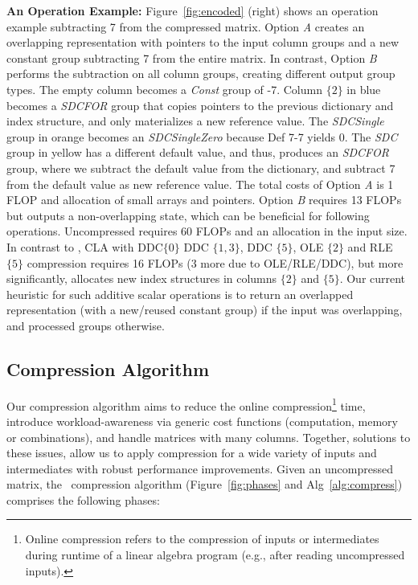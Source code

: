 

\textbf{An Operation Example:}
Figure~\ref{fig:encoded} (right) shows an operation example subtracting 7 from the compressed matrix.
Option \emph{A} creates an overlapping representation with pointers to the input column groups and a new constant group subtracting 7 from the entire matrix.
In contrast, Option \emph{B} performs the subtraction on all column groups, creating different output group types.
The empty column becomes a \emph{Const} group of -7.
Column $\{2\}$ in blue becomes a \emph{SDCFOR} group that copies pointers to the previous dictionary and index structure, and only materializes a new reference value.
The \emph{SDCSingle} group in orange becomes an \emph{SDCSingleZero} because Def 7-7 yields 0.
The \emph{SDC} group in yellow has a different default value, and thus, produces an \emph{SDCFOR} group, where we subtract the default value from the dictionary, and subtract 7 from the default value as new reference value.
%
The total costs of Option \emph{A} is 1 FLOP and allocation of small arrays and pointers.
Option \emph{B} requires 13 FLOPs but outputs a non-overlapping state, which can be beneficial for following operations.
Uncompressed requires 60 FLOPs and an allocation in the input size.
In contrast to \name, CLA with DDC$\{0\}$ DDC $\{1,3\}$, DDC $\{5\}$, OLE $\{2\}$ and RLE $\{5\}$ compression requires 16 FLOPs (3 more due to OLE/RLE/DDC), but more significantly, allocates new index structures in columns $\{2\}$ and $\{5\}$. Our current heuristic for such additive scalar operations is to return an overlapped representation (with a new/reused constant group) if the input was overlapping, and processed groups otherwise.

\subsection{Compression Algorithm}
\label{sec:compressalg}

Our compression algorithm aims to reduce the online compression\footnote{Online compression refers to the compression of inputs or intermediates during runtime of a linear algebra program (e.g., after reading uncompressed inputs).} time, introduce workload-awareness via generic cost functions (computation, memory or combinations), and handle matrices with many columns. Together, solutions to these issues, allow us to apply compression for a wide variety of inputs and intermediates with robust performance improvements. Given an uncompressed matrix, the \name\ compression algorithm (Figure~\ref{fig:phases} and Alg~\ref{alg:compress}) comprises the following phases:

